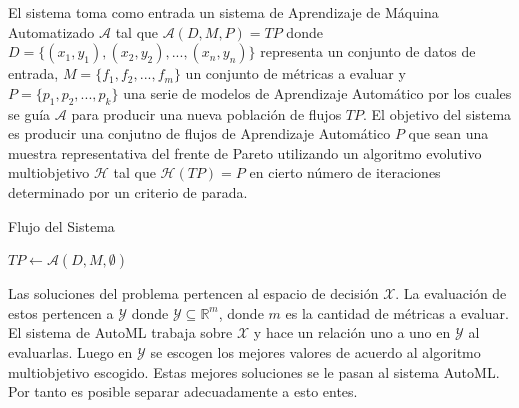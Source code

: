 \begin{definition}
El sistema toma como entrada un sistema de Aprendizaje de M\'aquina Automatizado $\mathcal{A}$ tal que $\mathcal{A}(D, M, P) = TP$ donde $D = \{(x_1, y_1), (x_2, y_2), ..., (x_n, y_n)\}$ representa un conjunto de datos de entrada, $M = \{f_1, f_2, ..., f_m\}$ un conjunto de m\'etricas a evaluar y $P = \{p_1, p_2, ..., p_k\}$ una serie de modelos de Aprendizaje Autom\'atico por los cuales se gu\'ia $\mathcal{A}$ para producir una nueva poblaci\'on de flujos $TP$. El objetivo del sistema es producir una conjutno de flujos de Aprendizaje Autom\'atico $P$ que sean una muestra representativa del frente de Pareto utilizando un algoritmo evolutivo multiobjetivo  $\mathcal{H}$ tal que $\mathcal{H}(TP) = P$ en cierto n\'umero de iteraciones determinado por un criterio de parada. 
\end{definition}

\begin{algorithm}[H]\caption{Flujo del Sistema}
    
    $TP \gets \mathcal{A}(D, M, \emptyset)$ 
\end{algorithm}

Las soluciones del problema pertencen al espacio de decisi\'on $\mathcal{X}$. La evaluaci\'on de estos pertencen a $\mathcal{Y}$ donde $\mathcal{Y} \subseteq \mathbb{R}^m$, donde $m$ es la cantidad de m\'etricas a evaluar. El sistema de AutoML trabaja sobre $\mathcal{X}$ y hace un relaci\'on uno a uno en $\mathcal{Y}$ al evaluarlas. Luego en $\mathcal{Y}$ se escogen los mejores valores de acuerdo al algoritmo multiobjetivo escogido. Estas mejores soluciones se le pasan al sistema AutoML. Por tanto es posible separar adecuadamente a esto entes.


